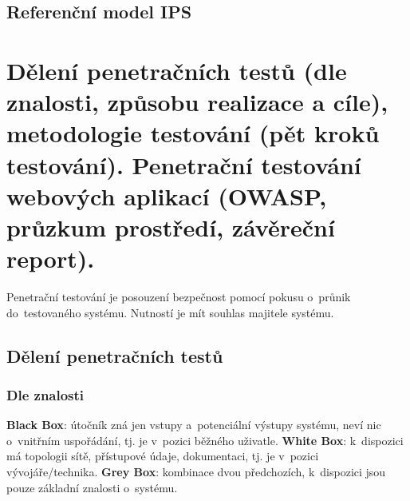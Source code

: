 \subsection{Referenční model IPS}

\begin{figure}[ht]
\centering
{}
\end{figure}

\clearpage
\section{Dělení penetračních testů (dle znalosti, způsobu realizace a cíle), metodologie testování (pět kroků testování). Penetrační testování webových aplikací (OWASP, průzkum prostředí, závěreční report).}

Penetrační testování je posouzení bezpečnost pomocí pokusu o~průnik do~testovaného systému. Nutností je mít souhlas majitele systému.

\subsection{Dělení penetračních testů}

\subsubsection*{Dle znalosti}

\textbf{Black Box}: útočník zná jen vstupy a~potenciální výstupy systému, neví nic o~vnitřním uspořádání, tj. je v~pozici běžného uživatle. \textbf{White Box}: k~dispozici má topologii sítě, přístupové údaje, dokumentaci, tj. je v~pozici vývojáře/technika. \textbf{Grey Box}: kombinace dvou předchozích, k~dispozici jsou pouze základní znalosti o~systému.

